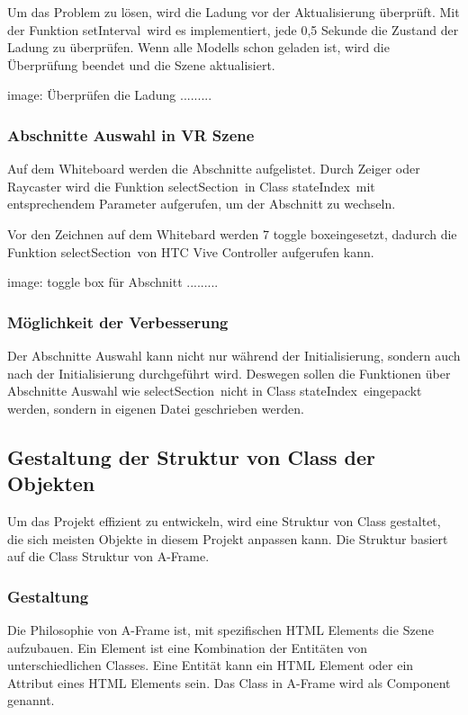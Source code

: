   Um das Problem zu lösen, wird die Ladung vor der Aktualisierung überprüft. Mit der Funktion \glqq setInterval\grqq\ wird es implementiert, jede 0,5 Sekunde die Zustand der Ladung zu überprüfen. Wenn alle Modells schon geladen ist, wird die Überprüfung beendet und die Szene aktualisiert.
  
  image: Überprüfen die Ladung .........
  
  \subsubsection{Abschnitte Auswahl in VR Szene}
  Auf dem Whiteboard werden die Abschnitte aufgelistet. Durch Zeiger oder Raycaster wird die Funktion \glqq selectSection\grqq\ in Class \glqq stateIndex\grqq\ mit entsprechendem Parameter aufgerufen, um der Abschnitt zu wechseln.
  
  Vor den Zeichnen auf dem Whitebard werden 7 \glqq toggle box\grqq eingesetzt, dadurch die Funktion \glqq selectSection\grqq\ von HTC Vive Controller aufgerufen kann.
  
  image: toggle box für Abschnitt .........
  
  \subsubsection{Möglichkeit der Verbesserung}
  Der Abschnitte Auswahl kann nicht nur während der Initialisierung, sondern auch nach der Initialisierung durchgeführt wird. Deswegen sollen die Funktionen über Abschnitte Auswahl wie \glqq selectSection\grqq\ nicht in Class \glqq stateIndex\grqq\ eingepackt werden, sondern in eigenen Datei geschrieben werden.
  
 \subsection{Gestaltung der Struktur von Class der Objekten}
 Um das Projekt effizient zu entwickeln, wird eine Struktur von Class gestaltet, die sich meisten Objekte in diesem Projekt anpassen kann. Die Struktur basiert auf die Class Struktur von A-Frame.
 
 \subsubsection{Gestaltung}
 Die Philosophie von A-Frame ist, mit spezifischen HTML Elements die Szene aufzubauen. Ein Element ist eine Kombination der Entitäten von unterschiedlichen Classes. Eine Entität kann ein HTML Element oder ein Attribut eines HTML Elements sein. Das Class in A-Frame wird als Component genannt.
 
